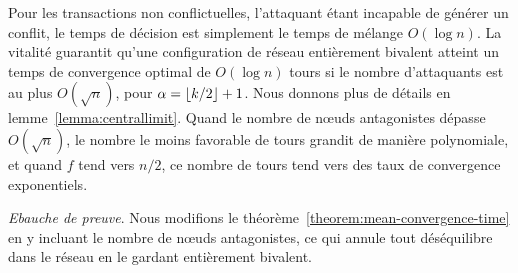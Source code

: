 \documentclass[letterpaper,twocolumn,10pt]{article}
\DeclarePairedDelimiter{\floor}{\lfloor}{\rfloor}
\newcommand{\Oh}[1]{O(#1)}
\theoremstyle{definition}
\begin{document}
Pour les transactions non conflictuelles, l'attaquant étant incapable de générer un conflit, le temps de décision
est simplement le temps de mélange $\Oh{\log{n}}$. La vitalité guarantit qu'une configuration de réseau
entièrement bivalent atteint un temps de convergence optimal de $\Oh{\log{n}}$ tours si le nombre d'attaquants est au
plus $\Oh{\sqrt{n}}$, pour $\alpha = \floor{k/2} + 1$. Nous donnons plus de détails en
lemme~\ref{lemma:centrallimit}.
Quand le nombre de nœuds antagonistes dépasse $\Oh{\sqrt{n}}$, le nombre le moins favorable de tours grandit de manière
polynomiale, et quand $f$ tend vers $n/2$, ce nombre de tours tend vers des taux de convergence exponentiels.

\noindent \emph{Ebauche de preuve}. Nous modifions le théorème~\ref{theorem:mean-convergence-time} en y incluant le
nombre de nœuds antagonistes, ce qui annule tout déséquilibre dans le réseau en le gardant entièrement bivalent.
\end{document}
